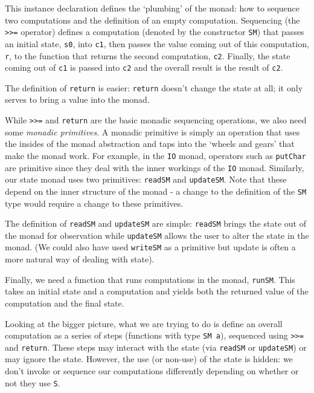 This instance declaration defines the `plumbing' of the monad: how to
sequence two computations and the definition of an empty computation.
Sequencing (the \mbox{\tt >>=} operator) defines a computation (denoted by the
constructor \mbox{\tt SM}) that passes an initial 
state, \mbox{\tt s0}, into \mbox{\tt c1}, then passes the value coming out of this
computation, \mbox{\tt r}, to the function that returns the second computation,
\mbox{\tt c2}.  Finally, the state coming out of \mbox{\tt c1} is passed into \mbox{\tt c2} and
the overall result is the result of \mbox{\tt c2}.  

The definition of \mbox{\tt return} is easier: \mbox{\tt return} doesn't change the
state at all; it only serves to bring a value into the monad.  

While \mbox{\tt >>=} and \mbox{\tt return} are the basic monadic sequencing operations,
we also need some {\em monadic primitives}.  A monadic primitive is
simply an operation that uses the insides of the monad abstraction and
taps into 
the `wheels and gears' that make the monad work.  For example, in the
\mbox{\tt IO} monad, operators such as \mbox{\tt putChar} are primitive since they deal
with the inner workings of the \mbox{\tt IO} monad.  Similarly, our state monad
uses two primitives: \mbox{\tt readSM} and \mbox{\tt updateSM}.  Note that these depend
on the inner structure of the monad - a change to the definition of
the \mbox{\tt SM} type would require a change to these primitives.

The definition of \mbox{\tt readSM} and \mbox{\tt updateSM} are simple: \mbox{\tt readSM} brings
the state out of the monad for observation while \mbox{\tt updateSM} allows the
user to alter the state in the monad.  (We could also have used
\mbox{\tt writeSM} as a primitive but update is often a more natural way of
dealing with state).  

Finally, we need a function that runs computations in the monad,
\mbox{\tt runSM}.  This takes an initial state and a computation and yields
both the returned value of the computation and the final state.

Looking at the bigger picture, what we are trying to do is define an
overall computation as a series of steps (functions with type
\mbox{\tt SM\ a}), sequenced using \mbox{\tt >>=} and \mbox{\tt return}.  These steps may interact
with the state (via \mbox{\tt readSM} or \mbox{\tt updateSM}) or may ignore the state.
However, the use (or non-use) of the state is hidden: we don't invoke
or sequence our computations differently depending on whether or not
they use \mbox{\tt S}.  

